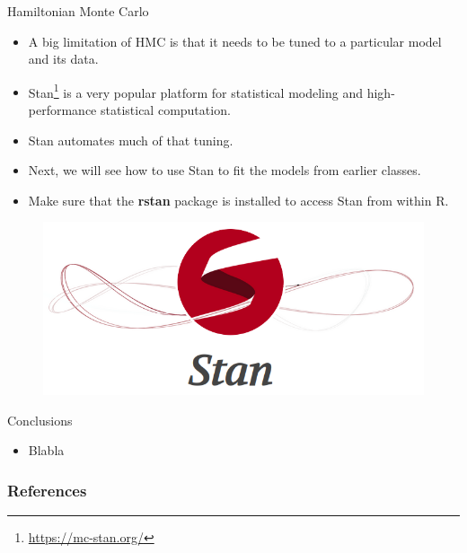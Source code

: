 \documentclass[handout]{beamer}
\begin{document}
\begin{frame}{Hamiltonian Monte Carlo}
\scriptsize{

\begin{itemize}
\item A big limitation of HMC is that it needs to be tuned to a particular model and its data.


\item Stan\footnote{\url{https://mc-stan.org/}} is a very popular platform for statistical modeling and high-performance statistical computation.


\item Stan automates much of that tuning.



\item Next, we will see how to use Stan to fit the models from earlier classes. 

\item Make sure that the \textbf{rstan} package is installed to access Stan from within R.

\end{itemize}


 \begin{figure}[h!]
	\centering
	\includegraphics[scale=0.2]{pics/stan.png}
	\end{figure} 


} 
\end{frame}

\begin{frame}{Conclusions}
\scriptsize{

\begin{itemize}
\item Blabla
\end{itemize}


} 
\end{frame}


\begin{frame}[allowframebreaks]\scriptsize
\frametitle{References}


%
\end{frame}  









\end{document}
